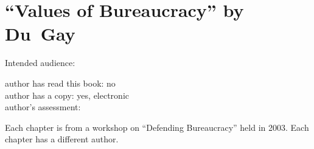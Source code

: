 \section{``Values of Bureaucracy'' by Du~Gay\label{review:dugay_values}}

\cite{2005_DuGay}

Intended audience:

author has read this book: no\\
author has a copy: yes, electronic\\
author's assessment:


Each chapter is from a workshop on ``Defending
Bureaucracy'' held in 2003. Each chapter has a different author. 